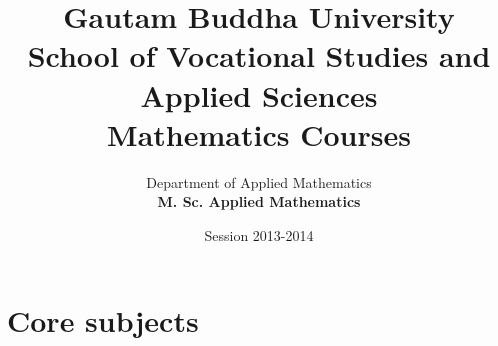 \documentclass[\small]{llncs}
\begin{document}
\title{Gautam Buddha University \\ School of Vocational Studies and Applied Sciences\\ Mathematics Courses}
\author{Department of Applied Mathematics \\ \textbf{M. Sc. Applied Mathematics} }
\date{Session 2013-2014}
\maketitle
\tableofcontents
\twocolumn
\normalsize
\part*{Core subjects}


\end{document}
